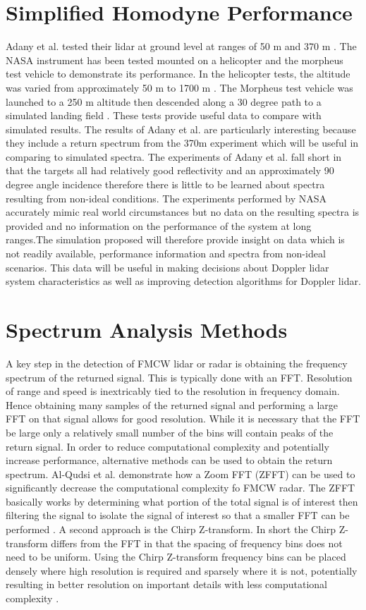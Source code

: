 \section{Simplified Homodyne Performance}
Adany et al.
tested their lidar at ground level at ranges of 50 m and 370 m \cite{adany09}.
The NASA instrument has been tested mounted on a helicopter and the morpheus
test vehicle to demonstrate its performance.
In the helicopter tests, the altitude was varied from approximately 50 m to 1700
m \cite{pierrottet2009flight,pierrottet2011navigation}.
The Morpheus test vehicle was launched to a 250 m altitude then descended
along a 30 degree path to a simulated landing field \cite{amz16coherent}.
These tests provide useful data to compare with simulated results.
The results of Adany et al.
are particularly interesting because they include a return spectrum from
the 370m experiment which will be useful in comparing to simulated spectra.
The experiments of Adany et al.
fall short in that the targets all had relatively good reflectivity and
an approximately 90 degree angle incidence therefore there is little to
be learned about spectra resulting from non-ideal conditions.
The experiments performed by NASA accurately mimic real world circumstances
but no data on the resulting spectra is provided and no information on
the performance of the system at long ranges.The simulation proposed will
therefore provide insight on data which is not readily available, performance
information and spectra from non-ideal scenarios.
This data will be useful in making decisions about Doppler lidar system
characteristics as well as improving detection algorithms for Doppler lidar.

\section{Spectrum Analysis Methods}
A key step in the detection of FMCW lidar or radar is obtaining the frequency spectrum 
of the returned signal. This is typically done with an FFT. Resolution of range and speed
is inextricably tied to the resolution in frequency domain. Hence obtaining many samples
of the returned signal and performing a large FFT on that signal allows for good 
resolution. While it is necessary that the FFT be large only a relatively small 
number of the bins will contain peaks of the return signal. In order to reduce computational
complexity and potentially increase performance, alternative methods can be used to obtain 
the return spectrum. Al-Qudsi et al. demonstrate 
how a Zoom FFT (ZFFT) can be used to significantly decrease the computational complexity
fo FMCW radar. The ZFFT basically works by determining what portion of the total signal
is of interest then filtering the signal to isolate the signal of interest so that a smaller
FFT can be performed \cite{Al-QudsiZoomfft}. A second approach is the Chirp Z-transform. In short 
the Chirp Z-transform differs from the FFT in that the spacing of frequency bins does not need
to be uniform. Using the Chirp Z-transform frequency bins can be placed densely where high
resolution is required and sparsely where it is not, potentially resulting in better resolution
on important details with less computational complexity \cite{Pen-ChengChirpZ,wangThresh}. 

